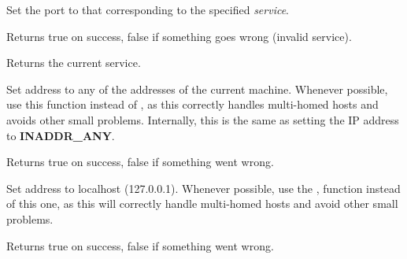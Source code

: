 
Set the port to that corresponding to the specified {\it service}.


Returns true on success, false if something goes wrong
(invalid service).


Returns the current service.

%
%

\label{wxipv4addressanyaddress}


Set address to any of the addresses of the current machine. Whenever
possible, use this function instead of ,
as this correctly handles multi-homed hosts and avoids other small
problems. Internally, this is the same as setting the IP address
to {\bf INADDR\_ANY}.


Returns true on success, false if something went wrong.

%
%

\label{wxipv4addresslocalhost}


Set address to localhost (127.0.0.1). Whenever possible, use the 
,
function instead of this one, as this will correctly handle multi-homed
hosts and avoid other small problems.


Returns true on success, false if something went wrong.

